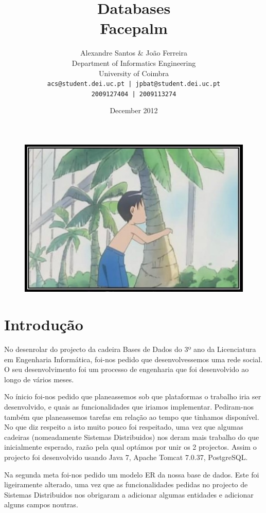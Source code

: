 \documentclass[a4paper, 12pt]{article}
\title{Databases\\Facepalm}
\author{Alexandre Santos \& João Ferreira\\
		Department of Informatics Engineering\\
		University of Coimbra\\
		\texttt{acs@student.dei.uc.pt | jpbat@student.dei.uc.pt}\\
		\texttt{2009127404 | 2009113274}}
\date{December 2012}
\begin{document}
\maketitle

\begin{figure}[h]
	\includegraphics[keepaspectratio=true, height=0.475\textheight]{cover}
\end{figure}

\cleardoublepage

\tableofcontents
\cleardoublepage

\setlength{\parindent}{1cm}
\setlength{\parskip}{0.3cm}

\section{Introdução}
\indent \indent No desenrolar do projecto da cadeira Bases de Dados do 3º ano da Licenciatura em Engenharia Informática, foi-nos pedido que desenvolvessemos uma rede social. O seu desenvolvimento foi um processo de engenharia que foi desenvolvido ao longo de vários meses.

No ínicio foi-nos pedido que planeassemos sob que plataformas o trabalho iria ser desenvolvido, e quais as funcionalidades que iriamos implementar. Pediram-nos também que planeassemos tarefas em relação ao tempo que tinhamos disponível. No que diz respeito a isto muito pouco foi respeitado, uma vez que algumas cadeiras (nomeadamente Sistemas Distribuidos) nos deram mais trabalho do que inicialmente esperado, razão pela qual optámos por unir os 2 projectos. Assim o projecto foi desenvolvido usando Java 7, Apache Tomcat 7.0.37, PostgreSQL.

Na segunda meta foi-nos pedido um modelo ER da nossa base de dados. Este foi ligeiramente alterado, uma vez que as funcionalidades pedidas no projecto de Sistemas Distribuidos nos obrigaram a adicionar algumas entidades e adicionar alguns campos noutras.
\end{document}
